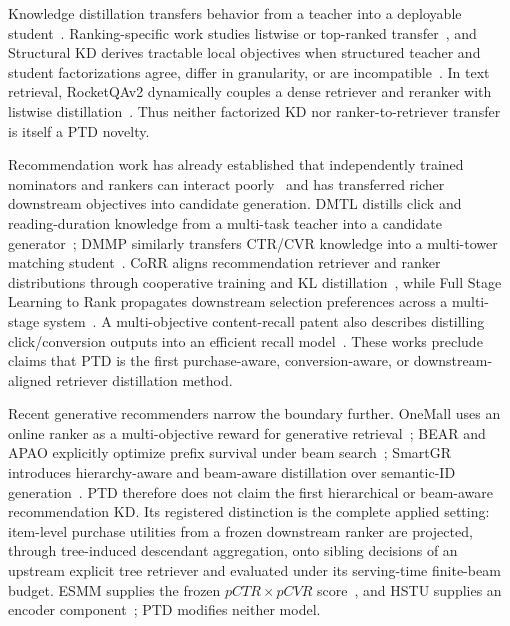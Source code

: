 \documentclass[sigconf,natbib=true]{acmart}
\begin{document}
Knowledge distillation transfers behavior from a teacher into a deployable student~\citep{hinton2015kd}. Ranking-specific work studies listwise or top-ranked transfer~\citep{tang2018ranking,reddi2021rankdistil}, and Structural KD derives tractable local objectives when structured teacher and student factorizations agree, differ in granularity, or are incompatible~\citep{wang2021structural}. In text retrieval, RocketQAv2 dynamically couples a dense retriever and reranker with listwise distillation~\citep{ren2021rocketqav2}. Thus neither factorized KD nor ranker-to-retriever transfer is itself a PTD novelty.

Recommendation work has already established that independently trained nominators and rankers can interact poorly~\citep{hron2021components} and has transferred richer downstream objectives into candidate generation. DMTL distills click and reading-duration knowledge from a multi-task teacher into a candidate generator~\citep{zhao2021dmtl}; DMMP similarly transfers CTR/CVR knowledge into a multi-tower matching student~\citep{yi2024dmmp}. CoRR aligns recommendation retriever and ranker distributions through cooperative training and KL distillation~\citep{huang2023corr}, while Full Stage Learning to Rank propagates downstream selection preferences across a multi-stage system~\citep{zheng2024fsltr}. A multi-objective content-recall patent also describes distilling click/conversion outputs into an efficient recall model~\citep{tencent2025recall}. These works preclude claims that PTD is the first purchase-aware, conversion-aware, or downstream-aligned retriever distillation method.

Recent generative recommenders narrow the boundary further. OneMall uses an online ranker as a multi-objective reward for generative retrieval~\citep{zhang2026onemall}; BEAR and APAO explicitly optimize prefix survival under beam search~\citep{yang2026bear,yu2026apao}; SmartGR introduces hierarchy-aware and beam-aware distillation over semantic-ID generation~\citep{zhang2026smartgr}. PTD therefore does not claim the first hierarchical or beam-aware recommendation KD. Its registered distinction is the complete applied setting: item-level purchase utilities from a frozen downstream ranker are projected, through tree-induced descendant aggregation, onto sibling decisions of an upstream explicit tree retriever and evaluated under its serving-time finite-beam budget. ESMM supplies the frozen $pCTR\times pCVR$ score~\citep{ma2018esmm}, and HSTU supplies an encoder component~\citep{zhai2024hstu}; PTD modifies neither model.
\end{document}
